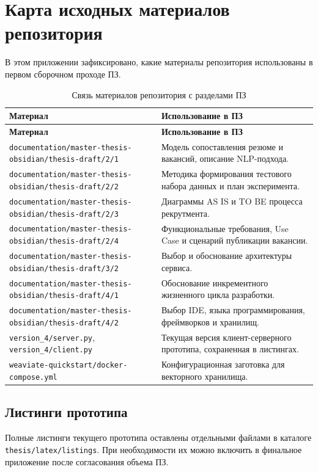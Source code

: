 \chapter{Карта исходных материалов репозитория}
\label{app:source-map}

В этом приложении зафиксировано, какие материалы репозитория использованы в первом сборочном проходе ПЗ.

\begin{longtable}{|p{}|p{}|}
\caption{Связь материалов репозитория с разделами ПЗ}\label{tbl:source-map}\\
\hline
\textbf{Материал} & \textbf{Использование в ПЗ} \\
\hline
\endfirsthead
\hline
\textbf{Материал} & \textbf{Использование в ПЗ} \\
\hline
\endhead
\texttt{documentation/master-thesis-obsidian/thesis-draft/2/1} & Модель сопоставления резюме и вакансий, описание NLP-подхода. \\
\hline
\texttt{documentation/master-thesis-obsidian/thesis-draft/2/2} & Методика формирования тестового набора данных и план эксперимента. \\
\hline
\texttt{documentation/master-thesis-obsidian/thesis-draft/2/3} & Диаграммы AS IS и TO BE процесса рекрутмента. \\
\hline
\texttt{documentation/master-thesis-obsidian/thesis-draft/2/4} & Функциональные требования, Use Case и сценарий публикации вакансии. \\
\hline
\texttt{documentation/master-thesis-obsidian/thesis-draft/3/2} & Выбор и обоснование архитектуры сервиса. \\
\hline
\texttt{documentation/master-thesis-obsidian/thesis-draft/4/1} & Обоснование инкрементного жизненного цикла разработки. \\
\hline
\texttt{documentation/master-thesis-obsidian/thesis-draft/4/2} & Выбор IDE, языка программирования, фреймворков и хранилищ. \\
\hline
\texttt{version\_4/server.py}, \texttt{version\_4/client.py} & Текущая версия клиент-серверного прототипа, сохраненная в листингах. \\
\hline
\texttt{weaviate-quickstart/docker-compose.yml} & Конфигурационная заготовка для векторного хранилища. \\
\hline
\end{longtable}

\section{Листинги прототипа}

Полные листинги текущего прототипа оставлены отдельными файлами в каталоге \texttt{thesis/latex/listings}. При необходимости их можно включить в финальное приложение после согласования объема ПЗ.
